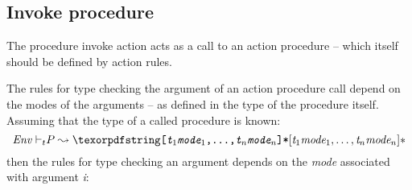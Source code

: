 \subsection{Invoke procedure}
\label{action:invoke}

The procedure invoke action acts as a call to an action procedure -- which itself should be defined by action rules. 

The rules for type checking the argument of an action procedure call depend on the modes of the arguments -- as defined in the type of the procedure itself. Assuming that the type of a called procedure is known:
\begin{equation}
\typeprd{Env}{P}{\q{[\emph{t\sub1}\emph{mode\sub1},\ldots,\emph{t\subn}\emph{mode\subn}]*}}
\end{equation}
then the rules for type checking an argument  depends on the \emph{mode\subi} associated with argument \emph{i}:
